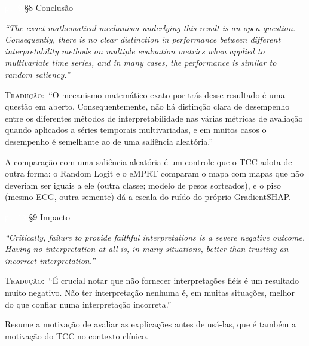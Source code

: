 \documentclass[11pt,a4paper]{article}
\newcommand{\pagechip}[1]{{\setlength{\fboxsep}{1.5pt}\colorbox{cAcc}{\textcolor{white}{\scriptsize\texttt{#1}}}}}
\newenvironment{origquote}{\par\itshape\small}{\par}
\newenvironment{tradquote}{\par\small\textsc{Tradução:}\ }{\par}
\newcommand{\explab}[1]{\par\smallskip{\small\color{cAcc}\textbf{\MakeUppercase{#1}}}\par}
\begin{document}
\begin{citacard}{\pagechip{p. 9} §8 Conclusão}
\begin{origquote}“The exact mathematical mechanism underlying this result is an open question. Consequently, there is no clear distinction in performance between different interpretability methods on multiple evaluation metrics when applied to multivariate time series, and in many cases, the performance is similar to random saliency.”\end{origquote}
\begin{tradquote}“O mecanismo matemático exato por trás desse resultado é uma questão em aberto. Consequentemente, não há distinção clara de desempenho entre os diferentes métodos de interpretabilidade nas várias métricas de avaliação quando aplicados a séries temporais multivariadas, e em muitos casos o desempenho é semelhante ao de uma saliência aleatória.”\end{tradquote}
\explab{Explicação}
A comparação com uma saliência aleatória é um controle que o TCC adota de outra forma: o Random Logit e o eMPRT comparam o mapa com mapas que não deveriam ser iguais a ele (outra classe; modelo de pesos sorteados), e o piso (mesmo ECG, outra semente) dá a escala do ruído do próprio GradientSHAP.
\end{citacard}

\begin{citacard}{\pagechip{p. 10} §9 Impacto}
\begin{origquote}“Critically, failure to provide faithful interpretations is a severe negative outcome. Having no interpretation at all is, in many situations, better than trusting an incorrect interpretation.”\end{origquote}
\begin{tradquote}“É crucial notar que não fornecer interpretações fiéis é um resultado muito negativo. Não ter interpretação nenhuma é, em muitas situações, melhor do que confiar numa interpretação incorreta.”\end{tradquote}
\explab{Explicação}
Resume a motivação de avaliar as explicações antes de usá-las, que é também a motivação do TCC no contexto clínico.
\end{citacard}
\end{document}

